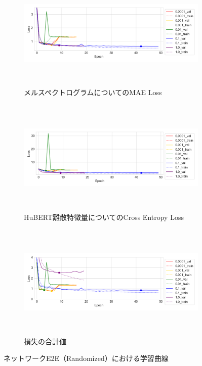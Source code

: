 \begin{figure}[bt]
    \centering
    \begin{subfigure}{\linewidth}
        \centering
        \includegraphics[height=55mm]{./figure/sec4/learning_curves/7/mel_loss.png}
        \caption{メルスペクトログラムについてのMAE Loss}
        \label{sec4:fig:learning_curve_method_7_val_mel_loss}
    \end{subfigure}
    \begin{subfigure}{\linewidth}
        \centering
        \includegraphics[height=55mm]{./figure/sec4/learning_curves/7/ssl_feature_cluster_loss.png}
        \caption{HuBERT離散特徴量についてのCross Entropy Loss}
        \label{sec4:fig:learning_curve_method_7_val_ssl_feature_cluster_loss}
    \end{subfigure}
    \begin{subfigure}{\linewidth}
        \centering
        \includegraphics[height=55mm]{./figure/sec4/learning_curves/7/total_loss.png}
        \caption{損失の合計値}
        \label{sec4:fig:learning_curve_method_7_val_total_loss}
    \end{subfigure}
    \caption{ネットワークE2E（Randomized）における学習曲線}
    \label{sec4:fig:learning_curve_method_7_val_losses}
\end{figure}

